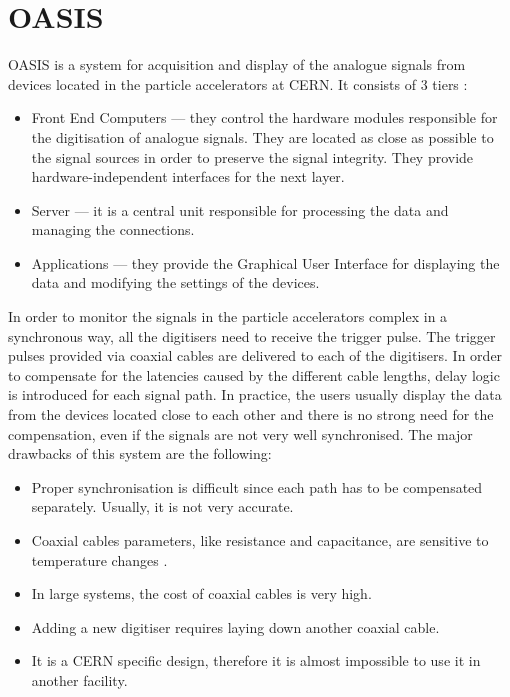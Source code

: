 \section{OASIS}
    OASIS is a system for acquisition and display of the analogue signals from devices located in the particle accelerators at CERN.
    It consists of 3 tiers \cite{OASIS}:
    \begin{itemize}
        \item Front End Computers --- they control the hardware modules responsible for the digitisation of analogue signals. They are located as close as possible to the signal sources in order to preserve the signal integrity. They provide hardware-independent interfaces for the next layer.
        \item Server --- it is a central unit responsible for processing the data and managing the connections.
        \item Applications --- they provide the Graphical User Interface for displaying the data and modifying the settings of the devices.
    \end{itemize}
    
    In order to monitor the signals in the particle accelerators complex in a synchronous way, all the digitisers need to receive the trigger pulse. The trigger pulses provided via coaxial cables are delivered to each of the digitisers. In order to compensate for the latencies caused by the different cable lengths, delay logic is introduced for each signal path. In practice, the users usually display the data from the devices located close to each other and there is no strong need for the compensation, even if the signals are not very well synchronised.
    The major drawbacks of this system are the following:
    \begin{itemize}
        \item Proper synchronisation is difficult since each path has to be compensated separately. Usually, it is not very accurate.
        \item Coaxial cables parameters, like resistance and capacitance, are sensitive to temperature changes \cite{temp_dep_coax_cables}. 
        \item In large systems, the cost of coaxial cables is very high.
        \item Adding a new digitiser requires laying down another coaxial cable.
        \item It is a CERN specific design, therefore it is almost impossible to use it in another facility.
    \end{itemize}
    

